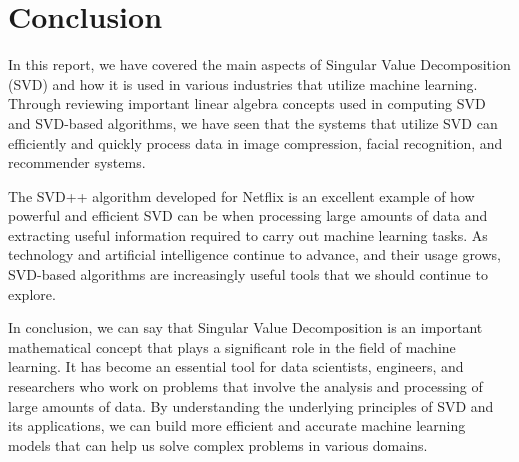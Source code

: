 \documentclass[12pt]{article}
\begin{document}
\section{Conclusion}
In this report, we have covered the main aspects of Singular Value Decomposition (SVD) and how it is used in various industries that utilize machine learning. Through reviewing important linear algebra concepts used in computing SVD and SVD-based algorithms, we have seen that the systems that utilize SVD can efficiently and quickly process data in image compression, facial recognition, and recommender systems.

The SVD++ algorithm developed for Netflix is an excellent example of how powerful and efficient SVD can be when processing large amounts of data and extracting useful information required to carry out machine learning tasks. As technology and artificial intelligence continue to advance, and their usage grows, SVD-based algorithms are increasingly useful tools that we should continue to explore.

In conclusion, we can say that Singular Value Decomposition is an important mathematical concept that plays a significant role in the field of machine learning. It has become an essential tool for data scientists, engineers, and researchers who work on problems that involve the analysis and processing of large amounts of data. By understanding the underlying principles of SVD and its applications, we can build more efficient and accurate machine learning models that can help us solve complex problems in various domains.
\newpage
\end{document}
